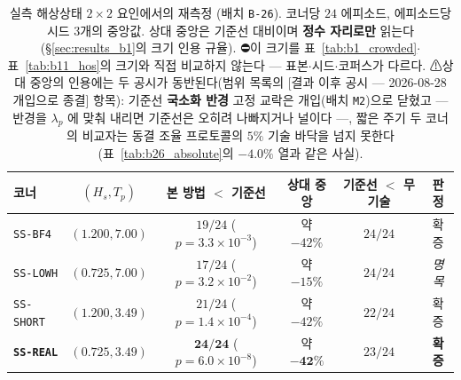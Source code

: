 \documentclass[11pt]{report}
\numberwithin{equation}{chapter}
\numberwithin{figure}{chapter}
\numberwithin{table}{chapter}
\begin{document}
\begin{table}[htbp]
\centering
\caption{실측 해상상태 $2\times2$ 요인에서의 재측정 (배치 \texttt{B-26}).
코너당 $24$ 에피소드, 에피소드당 시드 $3$개의 중앙값. 상대 중앙은 기준선 대비이며
\textbf{정수 자리로만} 읽는다(\S\ref{sec:results_b1}의 크기 인용 규율).
⛔이 크기를 표~\ref{tab:b1_crowded}$\cdot$표~\ref{tab:b11_hos}의 크기와 직접 비교하지
않는다 --- 표본$\cdot$시드$\cdot$코퍼스가 다르다.
⚠상대 중앙의 인용에는 두 공시가 동반된다(범위 목록의 [결과 이후 공시 ---
2026-08-28 개입으로 종결] 항목): 기준선 \textbf{국소화 반경} 고정 교락은
개입(배치 \texttt{M2})으로
닫혔고 --- 반경을 $\lambda_p$ 에 맞춰 내리면 기준선은 오히려 나빠지거나 널이다 ---,
짧은 주기 두 코너의 비교자는 동결 조율 프로토콜의 $5\%$ 기술 바닥을 넘지 못한다
(표~\ref{tab:b26_absolute}의 $-4.0\%$ 열과 같은 사실).}
\label{tab:b26_seastate}
\small
\setlength{\tabcolsep}{3.5pt}
\begin{tabular}{lccccc}
\toprule
코너 & $(H_s, T_p)$ & 본 방법 $<$ 기준선 & 상대 중앙 & 기준선 $<$ 무기술 & 판정 \\
\midrule
\texttt{SS-BF4}   & $(1.200, 7.00)$ & $19/24$ ($p = 3.3\times10^{-3}$) & 약 $-42\%$ & $24/24$ & 확증 \\
\texttt{SS-LOWH}  & $(0.725, 7.00)$ & $17/24$ ($p = 3.2\times10^{-2}$) & 약 $-15\%$ & $24/24$ & \emph{명목} \\
\texttt{SS-SHORT} & $(1.200, 3.49)$ & $21/24$ ($p = 1.4\times10^{-4}$) & 약 $-42\%$ & $22/24$ & 확증 \\
\textbf{\texttt{SS-REAL}} & $\mathbf{(0.725, 3.49)}$ & $\mathbf{24/24}$ ($p = 6.0\times10^{-8}$) & 약 $\mathbf{-42\%}$ & $23/24$ & \textbf{확증} \\
\bottomrule
\end{tabular}
\end{table}
\end{document}
